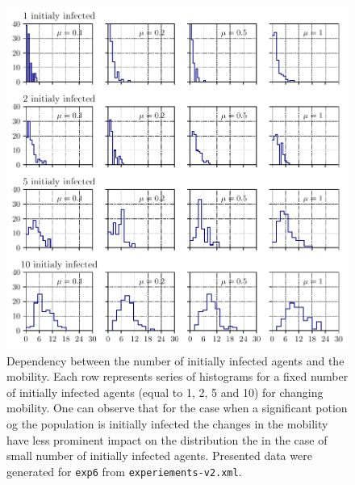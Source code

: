 \documentclass[11pt,a4paper]{article}
\begin{document}
\begin{figure}[ht!]
\includegraphics{plots/plot_exp6_pop100_world-1_hist.pdf}
\caption{Dependency between the number of initially infected agents and the mobility. Each row represents series of histograms for a fixed number of initially infected agents (equal to 1, 2, 5 and 10) for changing mobility. One can observe that for the case when a significant potion og the population is initially infected the changes in the mobility have less prominent impact on the distribution the in the case of small number of initially infected agents. Presented data were generated for \texttt{exp6} from  \texttt{experiements-v2.xml}.}
\label{fig:exp6_pop100_world-1_hist}
\end{figure}
\end{document}
